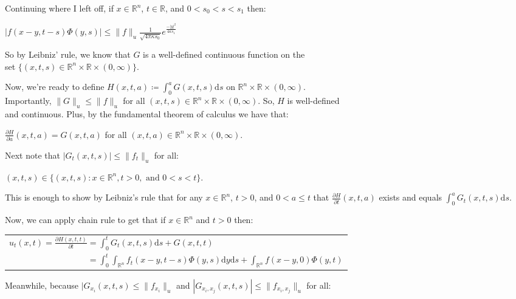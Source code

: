 \documentclass{book}
\newcommand{\exThreeP}{%
   \color{RedViolet}%
   \fontsize{12}{14}\selectfont%
}
\newenvironment{myIndent}{%
   \begin{adjustwidth}{2.5em}{0em}%
}{%
   \end{adjustwidth}%
}
\newcommand{\df}{\mathrm{d}}
\newcommand{\retTwo}{\hfill\bigbreak}
\begin{document}
\begin{myIndent}\exThreeP
	Continuing where I left off, if $x \in \mathbb{R}^n$, $t \in \mathbb{R}$, and  $0 < s_0 < s < s_1$ then:
	
	{\centering$|f(x - y, t - s) \Phi(y, s)| \leq \|f\|_u\frac{1}{\sqrt{4 \pi \kappa s_0}} e^{\frac{-|y|^2}{4\kappa s_1}}$\retTwo\par}

	So by Leibniz' rule, we know that $G$ is a well-defined continuous function on the\\ set $\{(x, t, s) \in \mathbb{R}^n \times \mathbb{R} \times (0, \infty)\}$.\retTwo

	Now, we're ready to define $H(x, t, a) \coloneqq \int_0^a G(x, t, s)\df s$ on $\mathbb{R}^n \times \mathbb{R} \times (0, \infty)$.\\ Importantly, $\|G\|_u \leq \|f\|_u$ for all $(x, t, s) \in \mathbb{R}^n \times \mathbb{R} \times (0, \infty)$. So, $H$ is well-defined\\ and continuous. Plus, by the fundamental theorem of calculus we have that:
	
	{\centering$\frac{\partial H}{\partial a}(x, t, a) = G(x, t, a)$ for all $(x, t, a) \in \mathbb{R}^n \times \mathbb{R} \times (0, \infty)$.\retTwo\par}

	Next note that $|G_t(x, t, s)| \leq \|f_t\|_u$ for all:
	
	{\centering$(x, t, s) \in \{(x, t, s) : x \in \mathbb{R}^n, t > 0, \text{ and } 0 < s < t\}$.\retTwo\par}

	This is enough to show by Leibniz's rule that for any $x \in \mathbb{R}^n$, $t > 0$, and $0 < a \leq t$ that $\frac{\partial H}{\partial t}(x, t, a)$ exists and equals $\int_0^a G_t(x, t, s)\df s$.\newpage

	Now, we can apply chain rule to get that if $x \in \mathbb{R}^n$ and $t > 0$ then:

	{\centering\begin{tabular}{l} 
		$u_t(x, t) = \frac{\partial H(x, t, t)}{\partial t} = \int_0^t G_t(x, t, s)\df s + G(x, t, t)$\\ [4pt]
		$\phantom{u_t(x, t) = \frac{\partial H(x, t, t)}{\partial t}} = \int_0^t \int_{\mathbb{R}^n} f_t(x - y, t - s)\Phi(y, s)\df y \df s + \int_{\mathbb{R}^n}f(x - y, 0)\Phi(y, t)$
	\end{tabular}\retTwo\par}

	Meanwhile, because $|G_{x_i}(x, t, s) \leq \|f_{x_i}\|_u$ and $|G_{x_i, x_j}(x, t, s)| \leq \|f_{x_i, x_j}\|_u$ for all:


\end{myIndent}
\end{document}
